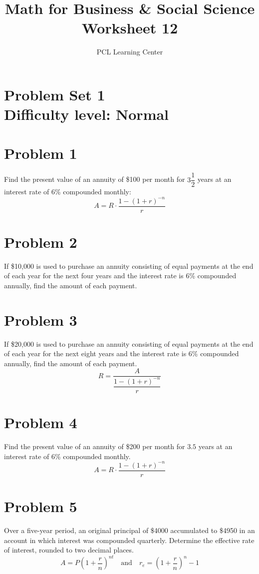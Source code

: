 \documentclass[12pt]{article}
\title{Math for Business \& Social Science\\ Worksheet 12}
\author{PCL Learning Center}
\date{}
\begin{document}
\maketitle

\section*{Problem Set 1\\Difficulty level: Normal}
\section*{Problem 1}
Find the present value of an annuity of \$100 per month for \(3 \dfrac{1}{2}\) years at an interest rate of 6\% compounded monthly:
\[
A = R \cdot \dfrac{1 - (1 + r)^{-n}}{r}
\]

\section*{Problem 2}
If \$10,000 is used to purchase an annuity consisting of equal payments at the end of each year for the next four years and the interest rate is 6\% compounded annually, find the amount of each payment.

\section*{Problem 3}
If \$20,000 is used to purchase an annuity consisting of equal payments at the end of each year for the next eight years and the interest rate is 6\% compounded annually, find the amount of each payment.
\[
R = \dfrac{A}{\dfrac{1 - (1 + r)^{-n}}{r}}
\]

\section*{Problem 4}
Find the present value of an annuity of \$200 per month for \(3.5\) years at an interest rate of 6\% compounded monthly.
\[
A = R \cdot \dfrac{1 - (1 + r)^{-n}}{r}
\]

\section*{Problem 5}
Over a five-year period, an original principal of \$4000 accumulated to \$4950 in an account in which interest was compounded quarterly. Determine the effective rate of interest, rounded to two decimal places.
\[
A = P \left(1 + \dfrac{r}{n} \right)^{nt} \quad \text{and} \quad r_e = \left(1 + \dfrac{r}{n} \right)^n - 1
\]
\end{document}
